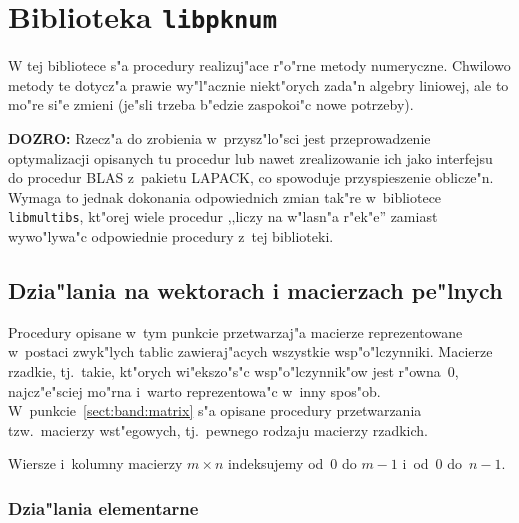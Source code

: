 

\chapter{Biblioteka \texttt{libpknum}}

W tej bibliotece s"a procedury realizuj"ace r"o"rne metody numeryczne.
Chwilowo metody te dotycz"a prawie wy"l"acznie niekt"orych zada"n algebry
liniowej, ale to mo"re si"e zmieni (je"sli trzeba b"edzie zaspokoi"c nowe
potrzeby).

\vspace{\medskipamount}
\noindent
\textbf{DOZRO:} Rzecz"a do zrobienia w~przysz"lo"sci jest przeprowadzenie
optymalizacji opisanych tu procedur lub nawet zrealizowanie ich jako
interfejsu do procedur BLAS z~pakietu LAPACK, co spowoduje przyspieszenie
oblicze"n. Wymaga to jednak dokonania odpowiednich zmian tak"re w~bibliotece
\texttt{libmultibs}, kt"orej wiele procedur ,,liczy na w"lasn"a r"ek"e''
zamiast wywo"lywa"c odpowiednie procedury z~tej biblioteki.


\section{Dzia"lania na wektorach i macierzach pe"lnych}

Procedury opisane w~tym punkcie przetwarzaj"a macierze reprezentowane
w~postaci zwyk"lych tablic zawieraj"acych wszystkie wsp"o"lczynniki.
Macierze rzadkie, tj.\ takie, kt"orych wi"ekszo"s"c wsp"o"lczynnik"ow
jest r"owna~$0$, najcz"e"sciej mo"rna i~warto reprezentowa"c w~inny spos"ob.
W~punkcie~\ref{sect:band:matrix} s"a opisane procedury przetwarzania
tzw.\ macierzy wst"egowych, tj.\ pewnego rodzaju macierzy rzadkich.

Wiersze i~kolumny macierzy $m\times n$ indeksujemy od~$0$ do $m-1$ i~od~$0$
do~$n-1$.


\subsection{Dzia"lania elementarne}

